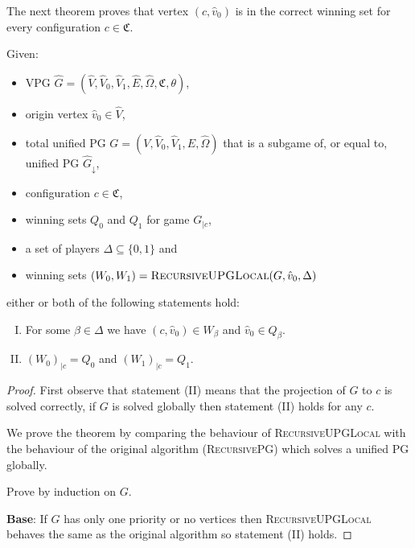 The next theorem proves that vertex $(c,\hat{v}_0)$ is in the correct winning set for every configuration $c \in \mathfrak{C}$.
\begin{theorem}
	Given:
	\begin{itemize}
		\item VPG $\hat{G} = (\hat{V}, \hat{V}_0,\hat{V}_1,\hat{E},\hat{\Omega},\mathfrak{C},\theta)$,
		\item origin vertex $\hat{v}_0 \in \hat{V}$,
		\item total unified PG $G = (V, \hat{V}_0, \hat{V}_1,E,\hat{\Omega})$ that is a subgame of, or equal to, unified PG $\hat{G}_{\downarrow}$,
		\item configuration $c\in \mathfrak{C}$,
		\item winning sets $Q_0$ and $Q_1$ for game $G_{|c}$,
		\item a set of players $\Delta \subseteq \{0,1\}$ and
		\item winning sets $(W_0, W_1) = \textsc{RecursiveUPGLocal}(G,\hat{v}_0,\Delta)$
	\end{itemize}
either or both of the following statements hold:
	\begin{enumerate}[(I)]
		\item For some $\beta \in \Delta$ we have $(c,\hat{v}_0) \in W_\beta$ and $\hat{v}_0 \in Q_\beta$.
		\item $(W_0)_{|c} = Q_0$ and $(W_1)_{|c} = Q_1$.
	\end{enumerate}
\begin{proof}
	First observe that statement (II) means that the projection of $G$ to $c$ is solved correctly, if $G$ is solved globally then statement (II) holds for any $c$.
	
	We prove the theorem by comparing the behaviour of \textsc{RecursiveUPGLocal} with the behaviour of the original algorithm (\textsc{RecursivePG}) which solves a unified PG globally.
	
	Prove by induction on $G$.
	
	\textbf{Base}: If $G$ has only one priority or no vertices then \textsc{RecursiveUPGLocal} behaves the same as the original algorithm so statement (II) holds.


\end{proof}
\end{theorem}
